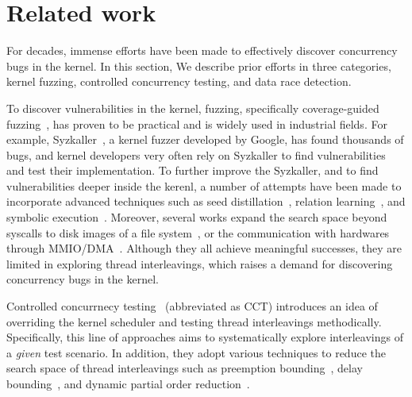 \section{Related work}
\label{s:relwk}

For decades, immense efforts have been made to effectively discover
concurrency bugs in the kernel. In this section, We describe prior
efforts in three categories, kernel fuzzing, controlled concurrency
testing, and data race detection.


%
To discover vulnerabilities in the kernel, fuzzing, specifically
coverage-guided fuzzing~\cite{syzkaller, moonshine, healer, hfl, imf,
  janus, hydra, trinity, kafl, periscope, syzvegas, ksg}, has proven
to be practical and is widely used in industrial fields.
%
For example, Syzkaller~\cite{syzkaller}, a kernel fuzzer developed by
Google, has found thousands of bugs, and kernel developers very often
rely on Syzkaller to find vulnerabilities and test their
implementation.
%
To further improve the Syzkaller, and to find vulnerabilities deeper
inside the kerenl, a number of attempts have been made to incorporate
advanced techniques such as seed distillation~\cite{moonshine},
relation learning~\cite{healer}, and symbolic execution~\cite{hfl}.
%
Moreover, several works expand the search space beyond syscalls to
disk images of a file system~\cite{janus, hydra}, or the communication
with hardwares through MMIO/DMA~\cite{periscope}.
%
Although they all achieve meaningful successes, they are limited in
exploring thread interleavings, which raises a demand for discovering
concurrency bugs in the kernel.







%
Controlled concurrnecy testing~\cite{ski, pctalgorithm, sparsernr,
  chess, nagarakatte2012multicore, abdelrasoul2017promoting,
  cai2016radius, mukherjee2020learning, schedulebounding} (abbreviated
as CCT) introduces an idea of overriding the kernel scheduler and
testing thread interleavings methodically.
%
Specifically, this line of approaches aims to systematically explore
interleavings of a \textit{given} test scenario.
%
In addition, they adopt various techniques to reduce the search space
of thread interleavings such as preemption
bounding~\cite{pctalgorithm, ski}, delay
bounding~\cite{delaybounding}, and dynamic partial order
reduction~\cite{dpor1, dpor2, dpor3}.



